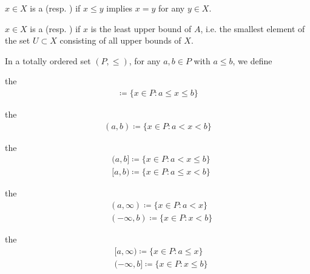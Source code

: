 \begin{definition}
\begin{defenum}
    \item\label{def:poset/maximal_minimal_element}\cite[170]{Enderton1977} \( x \in X \) is a  (resp. ) if \( x \leq y \) implies \( x = y \) for any \( y \in X \).

    \item\label{def:poset/supremum_infimum}\cite[170]{Enderton1977} \( x \in X \) is a  (resp. ) if \( x \) is the least upper bound of \( A \), i.e. the smallest element of the set \( U \subset X \) consisting of all upper bounds of \( X \).
  \end{defenum}
\end{definition}

\begin{definition}\label{def:total_order_interval}\cite{nLab:order_topology}
  In a totally ordered set \( (P, \leq) \), for any \( a, b \in P \) with \( a \leq b \), we define
  \begin{defenum}
    \item\label{def:total_order_interval/closed} the 
    \begin{align*}
      [a, b] \coloneqq \{ x \in P \colon a \leq x \leq b \}
    \end{align*}

    \item\label{def:total_order_interval/open} the 
    \begin{align*}
      (a, b) \coloneqq \{ x \in P \colon a < x < b \}
    \end{align*}

    \item\label{def:total_order_interval/half_open} the 
    \begin{align*}
      &(a, b] \coloneqq \{ x \in P \colon a < x \leq b \}
      \\
      &[a, b) \coloneqq \{ x \in P \colon a \leq x < b \}
    \end{align*}

    \item\label{def:total_order_interval/open_ray} the 
    \begin{align*}
      &(a, \infty) \coloneqq \{ x \in P \colon a < x \}
      \\
      &(-\infty, b) \coloneqq \{ x \in P \colon x < b \}
    \end{align*}

    \item\label{def:total_order_interval/closed_ray} the 
    \begin{align*}
      &[a, \infty) \coloneqq \{ x \in P \colon a \leq x \}
      \\
      &(-\infty, b] \coloneqq \{ x \in P \colon x \leq b \}
    \end{align*}
  \end{defenum}
\end{definition}

